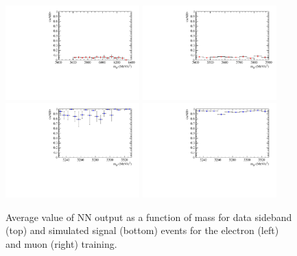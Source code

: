\begin{figure}
\centering
\includegraphics[width=0.46\textwidth]{RKst/figs/Training/EE_wNB_vs_MPV_bkg.pdf}
\includegraphics[width=0.46\textwidth]{RKst/figs/Training/MM_wNB_vs_MPV_bkg.pdf}
\includegraphics[width=0.46\textwidth]{RKst/figs/Training/EE_wNB_vs_MPV_sgn.pdf}
\includegraphics[width=0.46\textwidth]{RKst/figs/Training/MM_wNB_vs_MPV_sgn.pdf}
\caption{Average value of NN output as a function of \Bz mass for data
sideband (top) and simulated signal (bottom) events for the electron (left) and muon (right) training.}
\label{fig:RKst_NNprofiles}
\end{figure}
%
%
